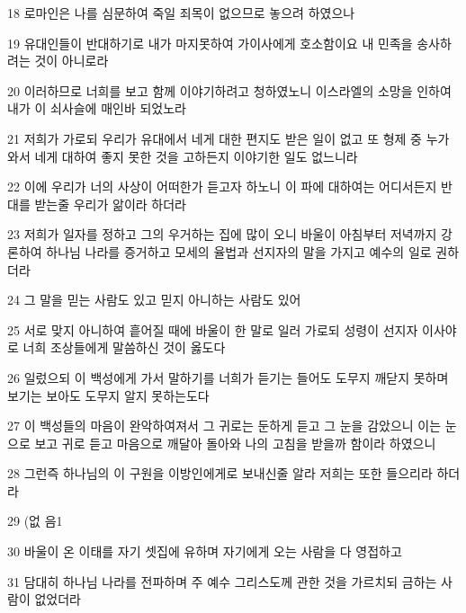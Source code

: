 \par 18 로마인은 나를 심문하여 죽일 죄목이 없으므로 놓으려 하였으나
\par 19 유대인들이 반대하기로 내가 마지못하여 가이사에게 호소함이요 내 민족을 송사하려는 것이 아니로라
\par 20 이러하므로 너희를 보고 함께 이야기하려고 청하였노니 이스라엘의 소망을 인하여 내가 이 쇠사슬에 매인바 되었노라
\par 21 저희가 가로되 우리가 유대에서 네게 대한 편지도 받은 일이 없고 또 형제 중 누가 와서 네게 대하여 좋지 못한 것을 고하든지 이야기한 일도 없느니라
\par 22 이에 우리가 너의 사상이 어떠한가 듣고자 하노니 이 파에 대하여는 어디서든지 반대를 받는줄 우리가 앎이라 하더라
\par 23 저희가 일자를 정하고 그의 우거하는 집에 많이 오니 바울이 아침부터 저녁까지 강론하여 하나님 나라를 증거하고 모세의 율법과 선지자의 말을 가지고 예수의 일로 권하더라
\par 24 그 말을 믿는 사람도 있고 믿지 아니하는 사람도 있어
\par 25 서로 맞지 아니하여 흩어질 때에 바울이 한 말로 일러 가로되 성령이 선지자 이사야로 너희 조상들에게 말씀하신 것이 옳도다
\par 26 일렀으되 이 백성에게 가서 말하기를 너희가 듣기는 들어도 도무지 깨닫지 못하며 보기는 보아도 도무지 알지 못하는도다
\par 27 이 백성들의 마음이 완악하여져서 그 귀로는 둔하게 듣고 그 눈을 감았으니 이는 눈으로 보고 귀로 듣고 마음으로 깨달아 돌아와 나의 고침을 받을까 함이라 하였으니
\par 28 그런즉 하나님의 이 구원을 이방인에게로 보내신줄 알라 저희는 또한 들으리라 하더라
\par 29 (없 음1
\par 30 바울이 온 이태를 자기 셋집에 유하며 자기에게 오는 사람을 다 영접하고
\par 31 담대히 하나님 나라를 전파하며 주 예수 그리스도께 관한 것을 가르치되 금하는 사람이 없었더라


